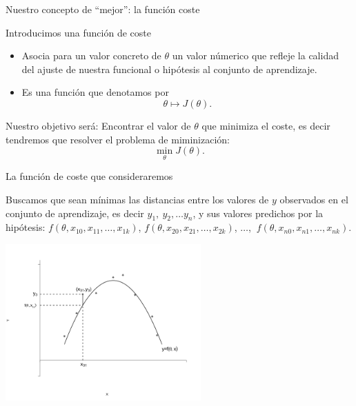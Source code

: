 \documentclass[aspectratio=169]{beamer}
\begin{document}
 \begin{frame}{Nuestro concepto de ``mejor'': la función coste}
   \begin{block}{Introducimos una función de coste}
     \begin{itemize}
     \item<+-> Asocia para un valor concreto de $\theta$ un valor númerico que refleje la calidad del ajuste de nuestra funcional o hipótesis al conjunto de aprendizaje.
     \item<+-> Es una función que denotamos por $$\theta\mapsto J(\theta).$$
     \end{itemize}
   \end{block}
   \begin{block}{Nuestro objetivo será: }
Encontrar el valor de $\theta$ que minimiza el coste, es decir tendremos que resolver el problema de miminización:\vspace{-0.3cm}
$$\min_{\theta}J(\theta).$$
     
   \end{block}
 \end{frame}
\begin{frame}{La función de coste que consideraremos}
   \begin{block}{}
    {\scriptsize Buscamos que sean mínimas las distancias entre los
      valores de $y$ observados en el conjunto de aprendizaje, es
      decir $y_1,\ y_2,\ldots y_n$,  y sus valores predichos por la
      hipótesis: $f(\theta,x_{10},x_{11},\ldots, x_{1k})$,
      $f(\theta,x_{20},x_{21},\ldots, x_{2k})$, $\ldots$, $\ f(\theta,x_{n0},x_{n1},\ldots, x_{nk})$.}
   \end{block}
    \includegraphics[height=6cm]{nubeajuste.png}
  \end{frame}
\end{document}
